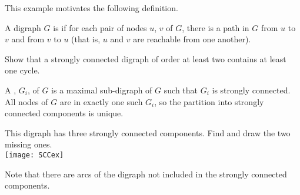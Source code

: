 This example motivates the following definition.

\begin{Definition}
A digraph $G$ is  if for each pair of nodes $u$, $v$ 
of $G$, there is a path in $G$ from $u$ to $v$ and from $v$ to $u$ (that is, $u$ and $v$ are reachable from one another).
\end{Definition}

\begin{Boxample}[4]
Show that a strongly connected digraph of order at least two contains at least one cycle.
\end{Boxample}



\begin{Definition} 
A , $G_i$, of $G$ is a maximal sub-digraph of $G$ 
such that $G_i$ is strongly connected. 
All nodes of $G$ are in exactly one such $G_i$, so the partition into strongly connected components is unique.
\end{Definition}

%

\begin{Boxample}[0]\label{eg:scc}

This digraph has three strongly connected components. Find and draw the two missing ones.\\

\texttt{[image: SCCex]}

Note that there are arcs of the digraph not included in the strongly connected components.
\end{Boxample}



